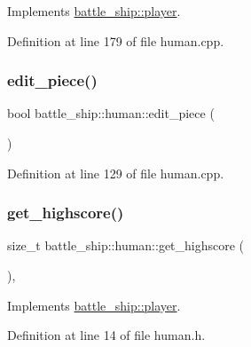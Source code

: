 Implements \hyperlink{classbattle__ship_1_1player_a86be2256620cd5e20da6db7be8afdbc8}{battle\+\_\+ship\+::player}.



Definition at line 179 of file human.\+cpp.

\mbox{\label{classbattle__ship_1_1human_a8f0addc975b597a92d4c82849c2fff5d}} 
\subsubsection{\texorpdfstring{edit\+\_\+piece()}{edit\_piece()}}
{\footnotesize\ttfamily bool battle\+\_\+ship\+::human\+::edit\+\_\+piece (\begin{DoxyParamCaption}{ }\end{DoxyParamCaption})}



Definition at line 129 of file human.\+cpp.

\mbox{\label{classbattle__ship_1_1human_ac3529c252376938ce6b62ac40f8df3b3}} 
\subsubsection{\texorpdfstring{get\+\_\+highscore()}{get\_highscore()}}
{\footnotesize\ttfamily size\+\_\+t battle\+\_\+ship\+::human\+::get\+\_\+highscore (\begin{DoxyParamCaption}{ }\end{DoxyParamCaption})\hspace{0.3cm}{\ttfamily [inline]}, {\ttfamily [virtual]}}



Implements \hyperlink{classbattle__ship_1_1player_a9b74e59f4b120d38ad591dba6a1d1ba7}{battle\+\_\+ship\+::player}.



Definition at line 14 of file human.\+h.

\mbox{\label{classbattle__ship_1_1human_ab6e8f18828d7671bbc7645f38369d370}} 
